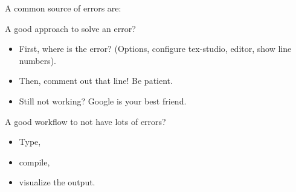 \documentclass{article}
\begin{document}
A common source of errors are:



A good approach to solve an error?
\begin{itemize}
	\item First, where is the error? (Options, configure tex-studio, editor, show line numbers).
	\item Then, comment out that line! Be patient. 
	\item Still not working? Google is your best friend. 
\end{itemize}


A good workflow to not have lots of errors?
\begin{itemize}
	\item Type, 
	\item compile, 
	\item visualize the output. 
\end{itemize}
\end{document}
